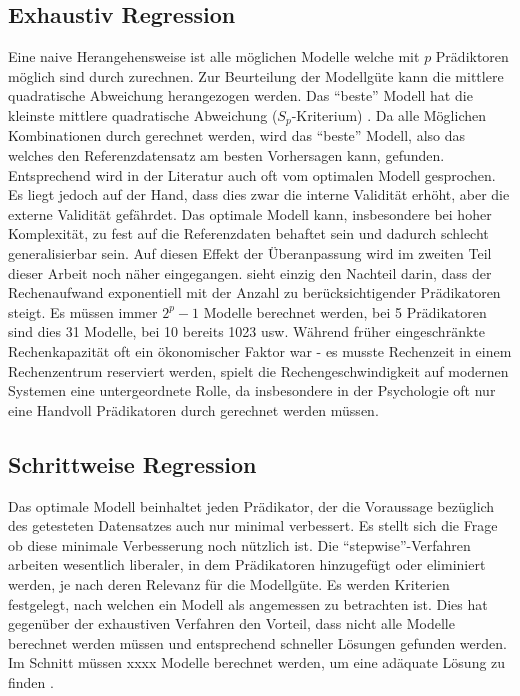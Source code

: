 \documentclass[english,12pt,doc]{apa}
\begin{document}
\subsection{Exhaustiv Regression} 
Eine naive Herangehensweise ist alle möglichen Modelle welche mit $p$ Prädiktoren möglich sind durch zurechnen. 
Zur Beurteilung der Modellgüte kann die mittlere quadratische Abweichung herangezogen werden. 
Das ``beste'' Modell hat die kleinste mittlere quadratische Abweichung ($S_p$-Kriterium) \cite{tobecite}. 
Da alle Möglichen Kombinationen durch gerechnet werden, wird das ``beste'' Modell, also das welches den Referenzdatensatz am besten Vorhersagen kann, gefunden. 
Entsprechend wird in der Literatur auch oft vom optimalen Modell gesprochen. Es liegt jedoch auf der Hand, dass dies zwar die interne Validität erhöht, aber die externe Validität gefährdet.
Das optimale Modell kann, insbesondere bei hoher Komplexität, zu fest auf die Referenzdaten behaftet sein und dadurch schlecht generalisierbar sein.
Auf diesen Effekt der Überanpassung wird im zweiten Teil dieser Arbeit noch näher eingegangen.  
 sieht einzig den Nachteil darin, dass der Rechenaufwand exponentiell mit der Anzahl zu berücksichtigender Prädikatoren steigt. 
Es müssen immer $2^p-1$ Modelle berechnet werden, bei 5 Prädikatoren sind dies 31 Modelle, bei 10 bereits 1023 usw.
Während früher eingeschränkte Rechenkapazität oft ein ökonomischer Faktor war - es musste Rechenzeit in einem Rechenzentrum reserviert werden, spielt die Rechengeschwindigkeit auf modernen Systemen eine untergeordnete Rolle, da insbesondere in der Psychologie oft nur eine Handvoll Prädikatoren durch gerechnet werden müssen.

\subsection{Schrittweise Regression} Das optimale Modell beinhaltet jeden Prädikator, der die Voraussage bezüglich des getesteten Datensatzes auch nur minimal verbessert. 
Es stellt sich die Frage ob diese minimale Verbesserung noch nützlich ist. 
Die ``stepwise''-Verfahren arbeiten wesentlich liberaler, in dem Prädikatoren hinzugefügt oder eliminiert werden, je nach deren Relevanz für die Modellgüte. 
Es werden Kriterien festgelegt, nach welchen ein Modell als angemessen zu betrachten ist. 
Dies hat gegenüber der exhaustiven Verfahren den Vorteil, dass nicht alle Modelle berechnet werden müssen und entsprechend schneller Lösungen gefunden werden. 
Im Schnitt müssen xxxx Modelle berechnet werden, um eine adäquate Lösung zu finden \cite{tobecite}.
\end{document}
